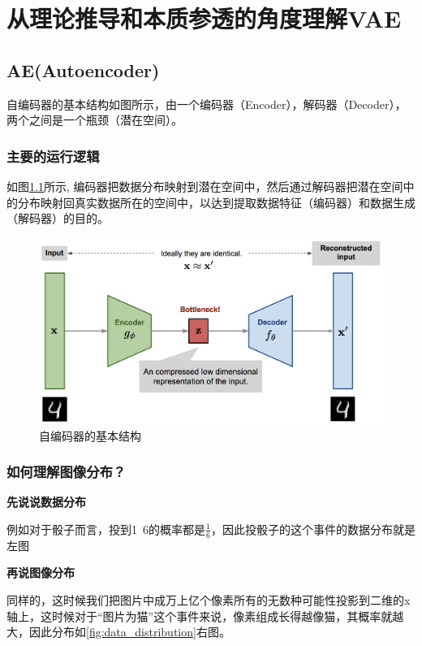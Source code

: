 \chapter{从理论推导和本质参透的角度理解VAE}

\section{AE(Autoencoder)}
自编码器的基本结构如图所示，由一个编码器（Encoder），解码器（Decoder），两个之间是一个瓶颈（潜在空间）。
\subsection{主要的运行逻辑}
如图\ref{fig:ae}所示,
编码器把数据分布映射到潜在空间中，然后通过解码器把潜在空间中的分布映射回真实数据所在的空间中，以达到提取数据特征（编码器）和数据生成（解码器）的目的。
\begin{figure}[htbp]
    \centering
    \includegraphics[width=\textwidth]{figures/chapter2/ae.png}
    \caption{自编码器的基本结构}
    \label{fig:ae}
\end{figure}

\subsection{如何理解图像分布？}
\textbf{先说说数据分布}

例如对于骰子而言，投到1~6的概率都是$\frac{1}{6}$，因此投骰子的这个事件的数据分布就是左图

\textbf{再说图像分布}

同样的，这时候我们把图片中成万上亿个像素所有的无数种可能性投影到二维的x轴上，这时候对于“图片为猫”这个事件来说，像素组成长得越像猫，其概率就越大，因此分布如\ref{fig:data_distribution}右图。

